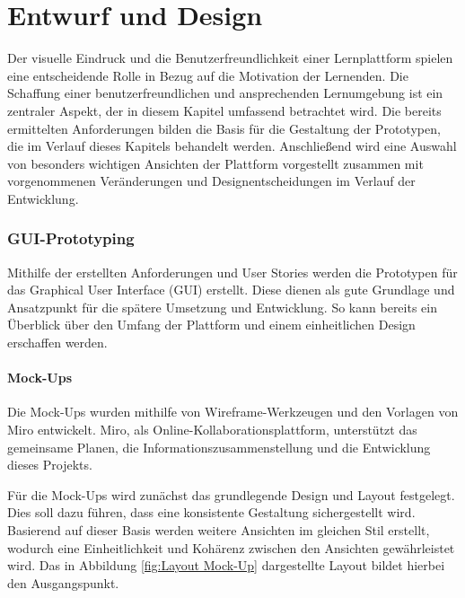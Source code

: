 \chapter{Entwurf und Design}

Der visuelle Eindruck und die Benutzerfreundlichkeit einer Lernplattform spielen eine entscheidende Rolle in Bezug auf die Motivation der Lernenden. Die Schaffung einer benutzerfreundlichen und ansprechenden Lernumgebung ist ein zentraler Aspekt, der in diesem Kapitel umfassend betrachtet wird.
Die bereits ermittelten Anforderungen bilden die Basis für die Gestaltung der Prototypen, die im Verlauf dieses Kapitels behandelt werden.
Anschließend wird eine Auswahl von besonders wichtigen Ansichten der Plattform vorgestellt zusammen mit vorgenommenen Veränderungen und Designentscheidungen im Verlauf der Entwicklung.

\subsection{GUI-Prototyping}
Mithilfe der erstellten Anforderungen und User Stories werden die Prototypen für das Graphical User Interface (GUI) erstellt. Diese dienen als gute Grundlage und Ansatzpunkt für die spätere Umsetzung und Entwicklung. 
So kann bereits ein Überblick über den Umfang der Plattform und einem einheitlichen Design erschaffen werden. 

\subsubsection{Mock-Ups}
Die Mock-Ups wurden mithilfe von Wireframe-Werkzeugen und den Vorlagen von Miro entwickelt. Miro, als Online-Kollaborationsplattform, unterstützt das gemeinsame Planen, die Informationszusammenstellung und die Entwicklung dieses Projekts.

Für die Mock-Ups wird zunächst das grundlegende Design und Layout festgelegt. Dies soll dazu führen, dass eine konsistente Gestaltung sichergestellt wird. Basierend auf dieser Basis werden weitere Ansichten im gleichen Stil erstellt, wodurch eine Einheitlichkeit und Kohärenz zwischen den Ansichten gewährleistet wird. Das in Abbildung \ref{fig:Layout Mock-Up} dargestellte Layout bildet hierbei den Ausgangspunkt.

